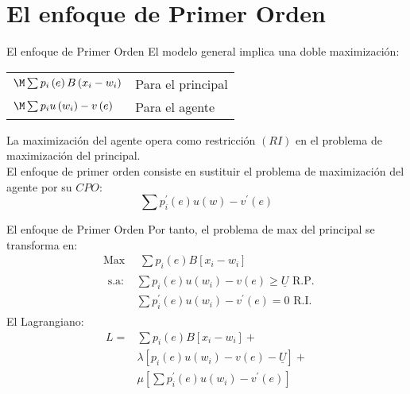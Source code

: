 \section{El enfoque de Primer Orden}

\begin{frame}{El enfoque de Primer Orden}
	El modelo general implica una doble maximización:\\
		\begin{center}
			\begin{tabular}{ll}
				$\M \sum p_i\left( e\right) B\left( x_i - w_i\right) $ & Para el principal\\
				$\M \sum p_iu\left( w_i\right) -v\left( e\right) $ & Para el agente
			\end{tabular}
		\end{center}
	La maximización del agente opera como restricción $(RI)$ en el problema de maximización del principal.\\[0.3cm]
	
	El enfoque de primer orden consiste en sustituir el problema de maximización del agente por su $CPO$:
		$$ \sum p_{i}^{\prime}(e)u\left( w\right) -v^{\prime}\left( e\right)$$
\end{frame}
\begin{frame}{El enfoque de Primer Orden}
	Por tanto, el problema de max del principal se transforma en:
		\begin{align*}
			& \text{Max } \quad \sum p_{i}(e)B\left[x_i - w_i \right] \\
			& \begin{array}{ll}
				\text{s.a: } & \sum p_{i}(e) u\left( w_i\right) - v\left( e \right) \geq \underline{U} \text{ R.P.}\\[0.3cm]
				& \sum p_{i}^{\prime}(e)u\left(w_i \right) - v^{\prime}\left( e\right) = 0  \text{ R.I.}
			\end{array}
		\end{align*}
	El Lagrangiano:
		\begin{align*}
			L = & \sum p_{i}(e)B\left[x_i - w_i \right] +\\[0.3cm]
				& \lambda \left[  p_{i}(e) u\left( w_i\right) - v\left( e \right) - \underline{U} \right]  +\\[0.3cm]
				& \mu \left[ \sum p_{i}^{\prime}(e)u\left(w_i \right) - v^{\prime}\left( e\right)\right] 
		\end{align*}
\end{frame}
